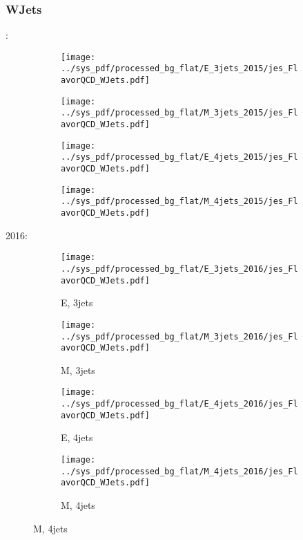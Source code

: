 \documentclass{beamer}
\begin{document}
\begin{frame}
\frametitle{WJets}
\fontsize{5}{1}:
\begin{figure}
\centering
\begin{subfigure}[b]{0.24\textwidth}
\texttt{[image: ../sys\_pdf/processed\_bg\_flat/E\_3jets\_2015/jes\_FlavorQCD\_WJets.pdf]}
\end{subfigure}
\begin{subfigure}[b]{0.24\textwidth}
\texttt{[image: ../sys\_pdf/processed\_bg\_flat/M\_3jets\_2015/jes\_FlavorQCD\_WJets.pdf]}
\end{subfigure}
\begin{subfigure}[b]{0.24\textwidth}
\texttt{[image: ../sys\_pdf/processed\_bg\_flat/E\_4jets\_2015/jes\_FlavorQCD\_WJets.pdf]}
\end{subfigure}
\begin{subfigure}[b]{0.24\textwidth}
\texttt{[image: ../sys\_pdf/processed\_bg\_flat/M\_4jets\_2015/jes\_FlavorQCD\_WJets.pdf]}
\end{subfigure}
\end{figure}
2016:
\begin{figure}
\centering
\begin{subfigure}[b]{0.24\textwidth}
\texttt{[image: ../sys\_pdf/processed\_bg\_flat/E\_3jets\_2016/jes\_FlavorQCD\_WJets.pdf]}
\captionsetup{font=tiny}
\caption{E, 3jets}
\end{subfigure}
\begin{subfigure}[b]{0.24\textwidth}
\texttt{[image: ../sys\_pdf/processed\_bg\_flat/M\_3jets\_2016/jes\_FlavorQCD\_WJets.pdf]}
\captionsetup{font=tiny}
\caption{M, 3jets}
\end{subfigure}
\begin{subfigure}[b]{0.24\textwidth}
\texttt{[image: ../sys\_pdf/processed\_bg\_flat/E\_4jets\_2016/jes\_FlavorQCD\_WJets.pdf]}
\captionsetup{font=tiny}
\caption{E, 4jets}
\end{subfigure}
\begin{subfigure}[b]{0.24\textwidth}
\texttt{[image: ../sys\_pdf/processed\_bg\_flat/M\_4jets\_2016/jes\_FlavorQCD\_WJets.pdf]}
\captionsetup{font=tiny}
\caption{M, 4jets}
\end{subfigure}
\end{figure}
\end{frame}
\end{document}
